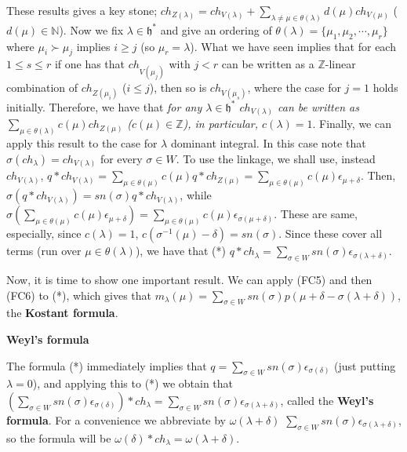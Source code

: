 \documentclass{article}
\newcommand{\NaN}{\mathbb{N}}
\newcommand{\InZ}{\mathbb{Z}}
\newcommand{\lie}[1]{\mathfrak{#1}}
\begin{document}
These results gives a key stone; $ch_{Z(\lambda)} = ch_{V(\lambda)} + \sum_{\lambda \ne \mu \in \theta(\lambda)} d(\mu) ch_{V(\mu)}$ ($d(\mu) \in \NaN$).
Now we fix $\lambda \in \lie{h}^*$ and give an ordering of $\theta(\lambda) = \{\mu_1, \mu_2, \cdots, \mu_r\}$ where $\mu_i \succ \mu_j$ implies $i \ge j$ (so $\mu_r = \lambda$).
What we have seen implies that for each $1 \le s \le r$ if one has that $ch_{V(\mu_j)}$ with $j < r$ can be written as a $\InZ$-linear combination of $ch_{Z(\mu_i)}$ ($i \le j$), then so is $ch_{V(\mu_s)}$, where the case for $j = 1$ holds initially.
Therefore, we have that \textit{for any $\lambda \in \lie{h}^*$ $ch_{V(\lambda)}$ can be written as $\sum_{\mu \in \theta(\lambda)} c(\mu) ch_{Z(\mu)}$ ($c(\mu) \in \InZ$), in particular, $c(\lambda) = 1$}.
Finally, we can apply this result to the case for $\lambda$ dominant integral.
In this case note that $\sigma(ch_\lambda) = ch_{V(\lambda)}$ for every $\sigma \in W$.
To use the linkage, we shall use, instead $ch_{V(\lambda)}$, $q * ch_{V(\lambda)} = \sum_{\mu \in \theta(\mu)} c(\mu) q * ch_{Z(\mu)} = \sum_{\mu \in \theta(\mu)} c(\mu) \epsilon_{\mu + \delta}$.
Then, $\sigma(q * ch_{V(\lambda)}) = sn(\sigma) q * ch_{V(\lambda)}$, while $\sigma(\sum_{\mu \in \theta(\mu)} c(\mu) \epsilon_{\mu + \delta}) = \sum_{\mu \in \theta(\mu)} c(\mu) \epsilon_{\sigma(\mu + \delta)}$.
These are same, especially, since $c(\lambda) = 1$, $c(\sigma^{-1}(\mu) - \delta) = sn(\sigma)$.
Since these cover all terms (run over $\mu \in \theta(\lambda)$), we have that (*) $q * ch_\lambda = \sum_{\sigma \in W} sn(\sigma) \epsilon_{\sigma(\lambda + \delta)}$.

Now, it is time to show one important result.
We can apply (FC5) and then (FC6) to (*), which gives that $m_\lambda(\mu) = \sum_{\sigma \in W} sn(\sigma) p(\mu + \delta - \sigma(\lambda + \delta))$, the \textbf{Kostant formula}.

\newpage

\textbf{Weyl's formula}

The formula (*) immediately implies that $q = \sum_{\sigma \in W} sn(\sigma) \epsilon_{\sigma(\delta)}$ (just putting $\lambda = 0$), and applying this to (*) we obtain that $(\sum_{\sigma \in W} sn(\sigma) \epsilon_{\sigma(\delta)}) * ch_\lambda = \sum_{\sigma \in W} sn(\sigma) \epsilon_{\sigma(\lambda + \delta)}$, called the \textbf{Weyl's formula}.
For a convenience we abbreviate by $\omega(\lambda + \delta)$ $\sum_{\sigma \in W} sn(\sigma) \epsilon_{\sigma(\lambda + \delta)}$, so the formula will be $\omega(\delta) * ch_\lambda = \omega(\lambda + \delta)$.
\end{document}

